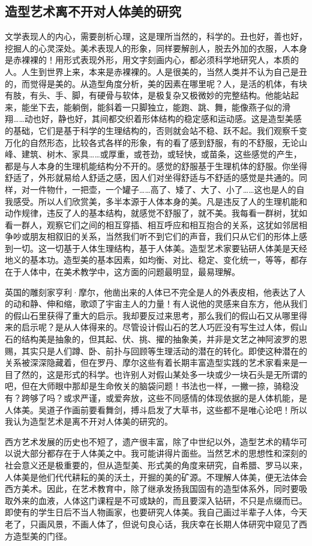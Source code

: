\documentclass{article}
\begin{document}
\subsection{造型艺术离不开对人体美的研究}
文学表现人的内心，需要剖析心理，这是理所当然的，科学的。丑也好，善也好，挖掘人的心灵深处。美术表现人的形象，同样要解剖人，脱去外加的衣服，人本身是赤裸裸的！用形式表现外形，用文字刻画内心，都必须科学地研究人，本质的人。人生到世界上来，本来是赤裸裸的。人是很美的，当然人类并不认为自己是丑的，而觉得是美的。从造型角度分析，美的因素在哪里呢？人，是活的机体，有块有肢，有头、手、脚，有硬骨与软体，是极复杂又极微妙的完整结构。他能站起来，能坐下去，能躺倒，能斜着一只脚独立，能跑、跳、舞，能像燕子似的滑翔……动也好，静也好，其间都交织着形体结构的稳定感和运动感。这是造型美感的基础，它们是基于科学的生理结构的，否则就会站不稳、跃不起。我们观察千变万化的自然形态，比较各式各样的形象，有的看了感到舒服，有的不舒服，无论山峰、建筑、树木、家具……或厚重，或苍劲，或轻快，或苗条，这些感觉的产生，都是与人本身的生理机能结构分不开的。感觉的舒服基于生理机体的舒服。你坐得舒适了，外形就易给人舒适之感，因人们对坐得舒适与不舒适的感觉是共通的。同样，对一件物什，一把壶，一个罐子……高了、矮了、大了、小了……这也是人的自我感受。所以人们欣赏美，多半本源于人体本身的美。凡是违反了人的生理机能和动作规律，违反了人的基本结构，就感觉不舒服了，就不美。我每看一群树，犹如看一群人，观察它们之间的相互穿插、相互呼应和相互抱合的关系，这犹如邻居相争吵或朋友相叙旧的关系，当然我们听不到它们的声音，我们只从它们的形体上感到一切。这一切基于人体生理结构，基于人体美。造型艺术家要钻研人体美是天经地义的基本功。造型美的基本因素，如均衡、对比、稳定、变化统一，等等，都存在于人体中，在美术教学中，这方面的问题最明显，最易理解。

英国的雕刻家亨利·摩尔，他凿出来的人体已不完全是人的外表皮相，他表达了人的动和静、伸和缩，歌颂了宇宙主人的力量！有人说他的灵感来自东方，他从我们的假山石里获得了重大的启示。我却要反过来思考，那么我们的假山石又从哪里得来的启示呢？是从人体得来的。尽管设计假山石的艺人巧匠没有写生过人体，假山石的结构美是抽象的，但其起、伏、挑、擢的抽象美，并非是文艺之神阿波罗的恩赐，其实只是人们蹲、卧、前扑与回顾等生理活动的潜在的转化。即使这种潜在的关系被深深隐藏着，但在罗丹、摩尔这些有着长期丰富造型实践的艺术家看来是一目了然的，这是形式的科学。也许别人对假山某处多一块或少一块石头是无所谓的吧，但在大师眼中那却是生命攸关的脑袋问题！书法也一样，一撇一捺，骑稳没有？跨够了吗？或求严谨，或爱奔放，这些不同感情的体现依据的是人体机能，是人体美。吴道子作画前要看舞剑，搏斗启发了大草书，这些都不是唯心论吧！所以我认为造型艺术是离不开对人体美的研究的。

西方艺术发展的历史也不短了，遗产很丰富，除了中世纪以外，造型艺术的精华可以说大部分都存在于人体美之中。我可能讲得片面些。当然艺术的思想性和深刻的社会意义还是极重要的，但从造型美、形式美的角度来研究，自希腊、罗马以来，人体美是他们代代耕耘的美的沃土，开掘的美的矿源。不理解人体美，便无法体会西方美术。因此，在艺术教育中，除了继承发扬我国固有的造型体系外，同时要吸取外来的血液，人体这门课程是不可或缺的，而且要深入钻研，不只是点缀而已。即使有的学生日后不当人物画家，也要研究人体美。我自己画过半辈子人体，今天老了，只画风景，不画人体了，但说句良心话，我庆幸在长期人体研究中窥见了西方造型美的门径。
\end{document}
